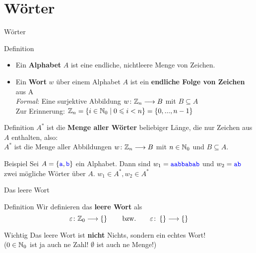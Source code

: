 \section{Wörter}

\begin{frame}{Wörter}
	\begin{block}{Definition}
		\begin{itemize}
			\item Ein \textbf{Alphabet} $A$ ist eine endliche, nichtleere Menge von Zeichen. \pause
			\item Ein \textbf{Wort} $w$  über einem Alphabet $A$ ist ein \textbf{endliche Folge von Zeichen} aus A \\ \pause
				\emph{Formal}: Eine surjektive Abbildung $w \colon \mathbb{Z}_n \longrightarrow B$ mit $B \subseteq A$\\[0.5em]
				Zur Erinnerung: $ \mathbb{Z}_n = \{i \in \mathbb{N}_0 \mid 0 \leqslant i < n \} = \left\{0, ..., n-1\right\} $ 
		\end{itemize}
	\end{block}	
	
	\pause
	\begin{block}{Definition}
		$A^*$ ist die \textbf{Menge aller Wörter} beliebiger Länge, die nur Zeichen aus $A$ enthalten, also:\\
		\pause 
		$A^*$ ist die Menge aller Abbildungen $w \colon \mathbb{Z}_n \longrightarrow B$ mit $n \in \mathbb{N}_0$ und $B \subseteq A$. \\
	\end{block}

	\pause
	\begin{block}{Beispiel}
		Sei $ A = \{ \hbox{\textcolor{blue}{\texttt{a}}}, \hbox{\textcolor{blue}{\texttt{b}}} \} $ ein Alphabet. 
		Dann sind $ w_1 = \hbox{\textcolor{blue}{\texttt{aabbabab}}}$ und $w_2 = \hbox{\textcolor{blue}{\texttt{ab}}} $ zwei mögliche Wörter über $A$. 
		\impl $ w_1 \in A^*, w_2 \in A^*$
	\end{block}

\end{frame}

\begin{frame}[t]{Das leere Wort}
	\begin{block}{Definition}
		Wir definieren das \textbf{leere Wort} als $$ \varepsilon \colon \mathbb{Z}_0  \longrightarrow \left\{\right\} \qquad\text{bzw.}\qquad \varepsilon \colon \left\{\right\} \longrightarrow \left\{\right\} $$ \pause

	\end{block}
	
	\begin{block}{Wichtig}
		Das leere Wort ist \textbf{nicht} Nichts, sondern ein echtes Wort! \\
		($0 \in \mathbb{N}_0$ ist ja auch ne Zahl! $\emptyset$ ist auch ne Menge!)
	\end{block}
		
	
\end{frame}


